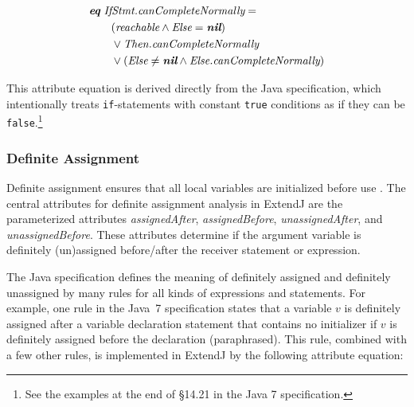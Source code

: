 \documentclass[10pt, twoside, openright]{book}
\begin{document}
\begin{align*}
& \textbf{\textit{eq}} \; \textit{IfStmt.canCompleteNormally} = \\
& \qquad (\textit{reachable} \land \textit{Else} = \textit{\textbf{nil}}) \\
& \qquad \lor \textit{Then.canCompleteNormally} \\
& \qquad \lor (\textit{Else} \ne \textit{\textbf{nil}} \land \textit{Else.canCompleteNormally})
\end{align*}

\noindent
This attribute equation is derived directly from the Java specification, which intentionally
treats \verb'if'-statements with constant \verb'true' conditions as if they can be
\verb'false'.\footnote{See the examples at the end of \S 14.21 in the Java 7 specification.}

\subsubsection{Definite Assignment}

Definite assignment ensures that all local variables are initialized before use \cite[\S 16]{jls7}.
The central attributes for definite assignment analysis in ExtendJ are the parameterized
attributes
\emph{assignedAfter}, \emph{assignedBefore}, \emph{unassignedAfter}, and \emph{unassignedBefore}.
These attributes determine if the argument variable
is definitely (un)assigned before/after the receiver statement or expression.


The Java specification defines the meaning of definitely assigned and definitely unassigned
by many rules for all kinds of expressions and statements. For example, one
rule in the Java~7 specification states that a variable $v$ is definitely assigned
after a variable declaration statement that contains no initializer if $v$
is definitely assigned before the declaration (paraphrased). This rule,
combined with a few other rules, is implemented in ExtendJ by the following
attribute equation:

\end{document}
